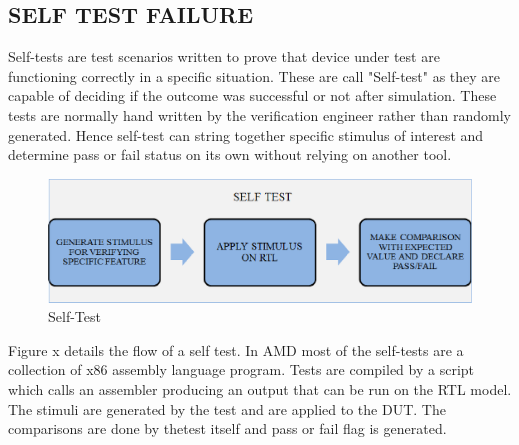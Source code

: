%
%
%

\subsection {SELF TEST FAILURE}

Self-tests are test scenarios written to prove that device under test are functioning correctly in a specific situation. These are call "Self-test" as they are capable of deciding if the outcome was successful or not after simulation. These tests are normally hand written by the verification engineer rather than randomly generated.  Hence self-test can string together specific stimulus of interest and determine pass or fail status on its own without relying on another tool. \\

\begin{figure}[H]
\centering
\includegraphics[width=5.5in]{./figures/selftest.eps}
\caption{Self-Test} 
\label{fig:selftest.eps}
\end{figure}

Figure x details the flow of a self test. In AMD most of the self-tests are a collection of x86 assembly language program. Tests are compiled by a script which calls an assembler producing an output that can be run on the RTL model. The stimuli are generated by the test and are applied to the DUT. The comparisons are done by thetest itself and pass or fail flag is generated. \\



